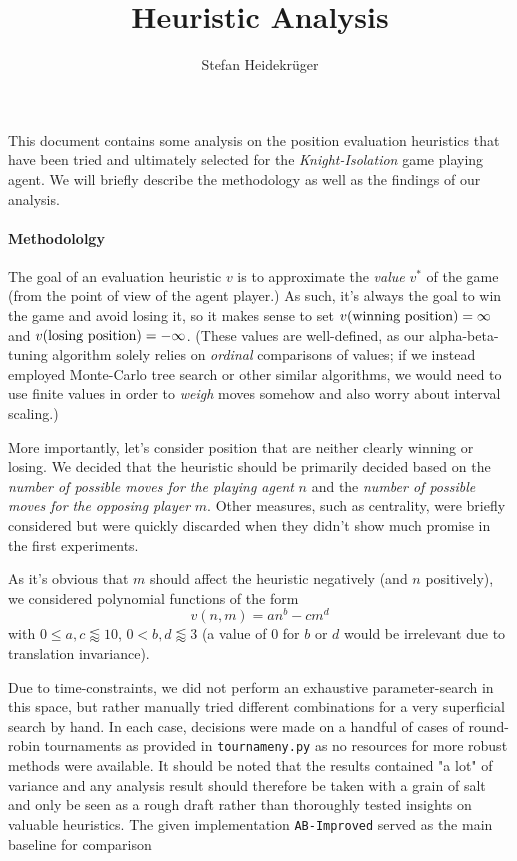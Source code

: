 \documentclass{article}
\title{Heuristic Analysis}
\author{Stefan Heidekrüger}
\theoremstyle{plain}
\theoremstyle{definition}
\theoremstyle{remark}
\begin{document}
\maketitle

This document contains some analysis on the position evaluation heuristics that have been tried and ultimately selected for the \emph{Knight-Isolation} game playing agent. We will briefly describe the methodology as well as the findings of our analysis.

\paragraph{Methodololgy}
The goal of an evaluation heuristic $v$ is to approximate the \emph{value} $v^*$ of the game (from the point of view of the agent player.) As such, it's always the goal to win the game and avoid losing it, so it makes sense to set $v(\textnormal{winning position}) = \infty$ and $v(\textnormal{losing position})=-\infty$. (These values are well-defined, as our alpha-beta-tuning algorithm solely relies on \emph{ordinal} comparisons of values; if we instead employed Monte-Carlo tree search or other similar algorithms, we would need to use finite values in order to \emph{weigh} moves somehow \textemdash and also worry about interval scaling.)

More importantly, let's consider position that are neither clearly winning or losing. We decided that the heuristic should be primarily decided based on the \emph{number of possible moves for the playing agent} $n$ and the \emph{number of possible moves for the opposing player} $m$. Other measures, such as centrality, were briefly considered but were quickly discarded when they didn't show much promise in the first experiments.

As it's obvious that $m$ should affect the heuristic negatively (and $n$ positively), we considered polynomial functions of the form
$$v(n,m) = an^b - cm^d $$
with $0 \leq a,c \lessapprox 10$, $0 < b,d \lessapprox 3$ (a value of $0$ for $b$ or $d$ would be irrelevant due to translation invariance).

Due to time-constraints, we did not perform an exhaustive parameter-search in this space, but rather manually tried different combinations for a very superficial search by hand. In each case, decisions were made on a handful of cases of round-robin tournaments as provided in \texttt{tournameny.py} as no resources for more robust methods were available. It should be noted that the results contained "a lot" of variance and any analysis result should therefore be taken with a grain of salt and only be seen as a rough draft rather than thoroughly tested insights on valuable heuristics. The given implementation \texttt{AB-Improved} served as the main baseline for comparison
\end{document}
